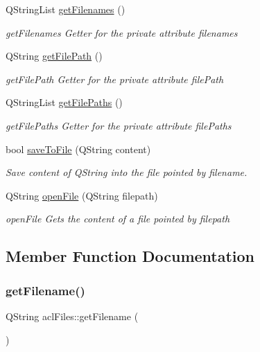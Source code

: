 \begin{DoxyCompactItemize}
Q\+String\+List \hyperlink{classaclFiles_a5740e2ee3301c0ec790059dd2640c235}{get\+Filenames} ()
\begin{DoxyCompactList}\small\item\em get\+Filenames Getter for the private attribute filenames \end{DoxyCompactList}\item 
Q\+String \hyperlink{classaclFiles_a9c7981b88715a060d0e93065fabd7dfc}{get\+File\+Path} ()
\begin{DoxyCompactList}\small\item\em get\+File\+Path Getter for the private attribute file\+Path \end{DoxyCompactList}\item 
Q\+String\+List \hyperlink{classaclFiles_a6c2a63e14203a702eabad2f3d076c638}{get\+File\+Paths} ()
\begin{DoxyCompactList}\small\item\em get\+File\+Paths Getter for the private attribute file\+Paths \end{DoxyCompactList}\item 
bool \hyperlink{classaclFiles_a59acda65294b886be102ecf7e08ccf64}{save\+To\+File} (Q\+String content)
\begin{DoxyCompactList}\small\item\em Save content of Q\+String into the file pointed by filename. \end{DoxyCompactList}\item 
Q\+String \hyperlink{classaclFiles_ab1a51796d7112b2a223e968375ac4be0}{open\+File} (Q\+String filepath)
\begin{DoxyCompactList}\small\item\em open\+File Gets the content of a file pointed by filepath \end{DoxyCompactList}\end{DoxyCompactItemize}


\subsection{Member Function Documentation}
\mbox{\label{classaclFiles_a3ef3210f1bb426a0d4c02867780d861f}} 
\subsubsection{\texorpdfstring{get\+Filename()}{getFilename()}\hspace{0.1cm}{\footnotesize\ttfamily [1/2]}}
{\footnotesize\ttfamily Q\+String acl\+Files\+::get\+Filename (\begin{DoxyParamCaption}{ }\end{DoxyParamCaption})}



